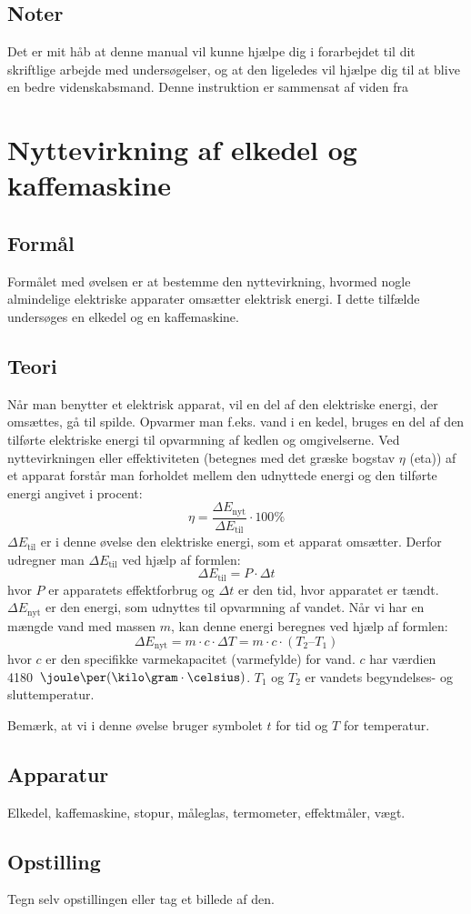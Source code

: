 \section{Noter}
Det er mit håb at denne manual vil kunne hjælpe dig i forarbejdet til dit skriftlige arbejde med undersøgelser, og at den ligeledes vil hjælpe dig til at blive en bedre videnskabsmand. Denne instruktion er sammensat af viden fra \citep{Hand2004, Greenbowe2005, Krogh2016}


\chapter{Nyttevirkning af elkedel og kaffemaskine}
\label{app:B}

\section{Formål}
Formålet med øvelsen er at bestemme den nyttevirkning, hvormed nogle almindelige elektriske apparater omsætter elektrisk energi. I dette tilfælde undersøges en elkedel og en kaffemaskine.

\section{Teori}
Når man benytter et elektrisk apparat, vil en del af den elektriske energi, der omsættes, gå til spilde. Opvarmer man f.eks. vand i en kedel, bruges en del af den tilførte elektriske energi til opvarmning af kedlen og omgivelserne.
Ved nyttevirkningen eller effektiviteten (betegnes med det græske bogstav $\eta$ (eta)) af et apparat forstår man forholdet mellem den udnyttede energi og den tilførte energi angivet i procent:
\begin{equation*}
	\eta = \frac{\Delta E_{\mathrm{nyt}}}{\Delta E_\mathrm{til}}\cdot 100 \%
\end{equation*}
$\Delta E_\mathrm{til}$ er i denne øvelse den elektriske energi, som et apparat omsætter. Derfor udregner man $\Delta E_\mathrm{til}$ ved hjælp af formlen:
\begin{equation*}
\Delta E_\mathrm{til} = P\cdot \Delta t
 \end{equation*}
hvor $P$ er apparatets effektforbrug og $\Delta t$ er den tid, hvor apparatet er tændt.
$\Delta E_{\mathrm{nyt}}$ er den energi, som udnyttes til opvarmning af vandet. Når vi har en mængde vand med massen $m$, kan denne energi beregnes ved hjælp af formlen:
\begin{equation*}
\Delta E_{\mathrm{nyt}} = m\cdot c\cdot \Delta T = m\cdot c\cdot (T_{2} – T_{1})
\end{equation*}
hvor $c$ er den specifikke varmekapacitet (varmefylde) for vand. $c$ har værdien \mbox{4180 $\joule\per(\kilo\gram\cdot\celsius)$}.
$T_1$ og $T_2$ er vandets begyndelses- og sluttemperatur.

Bemærk, at vi i denne øvelse bruger symbolet $t$ for tid og $T$ for temperatur.

\section{Apparatur}
Elkedel, kaffemaskine, stopur, måleglas, termometer, effektmåler, vægt.

\section{Opstilling}
Tegn selv opstillingen eller tag et billede af den.


